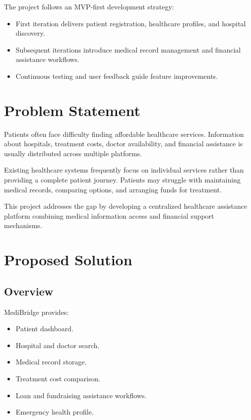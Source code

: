 \documentclass[12pt,a4paper]{article}
\begin{document}
The project follows an MVP-first development strategy:

\begin{itemize}
    \item First iteration delivers patient registration, healthcare
    profiles, and hospital discovery.
    \item Subsequent iterations introduce medical record management and
    financial assistance workflows.
    \item Continuous testing and user feedback guide feature improvements.
\end{itemize}

\section{Problem Statement}

Patients often face difficulty finding affordable healthcare services.
Information about hospitals, treatment costs, doctor availability, and
financial assistance is usually distributed across multiple platforms.

Existing healthcare systems frequently focus on individual services
rather than providing a complete patient journey. Patients may struggle
with maintaining medical records, comparing options, and arranging funds
for treatment.

This project addresses the gap by developing a centralized healthcare
assistance platform combining medical information access and financial
support mechanisms.

\section{Proposed Solution}

\subsection{Overview}

MediBridge provides:

\begin{itemize}
    \item Patient dashboard.
    \item Hospital and doctor search.
    \item Medical record storage.
    \item Treatment cost comparison.
    \item Loan and fundraising assistance workflows.
    \item Emergency health profile.
\end{itemize}
\end{document}
